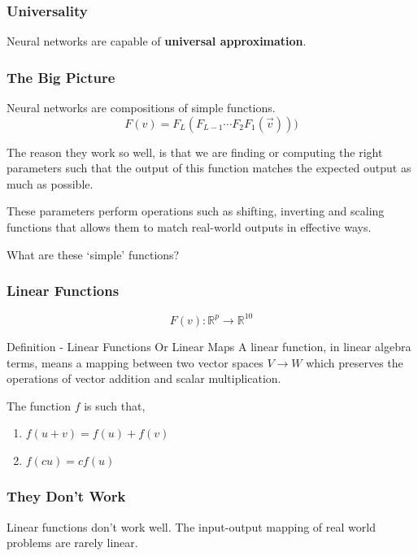 \documentclass{beamer}
\begin{document}
\begin{frame}
\frametitle{Universality}
Neural networks are capable of \textbf{universal approximation}.
\end{frame}

\begin{frame}
\frametitle{The Big Picture}
Neural networks are compositions of simple functions.
$$F(v) = F_L(F_{L-1} \cdots F_2F_1(\vec{v})))$$

The reason they work so well, is that we are finding or computing the right parameters such that the output of this function matches the expected output as much as possible.

\pause

These parameters perform operations such as shifting, inverting and scaling functions that allows them to match real-world outputs in effective ways.

\pause
What are these `simple' functions?
\end{frame}
\begin{frame}
  \frametitle{Linear Functions}
 \[F(v): \mathbb{R}^p \rightarrow \mathbb{R}^{10}\]
 \begin{block}{Definition - Linear Functions Or Linear Maps}
A linear function, in linear algebra terms, means a mapping between two vector spaces $V \rightarrow W$ which preserves the operations of vector addition and scalar multiplication.

The function $f$ is such that,
\begin{enumerate}
\item  $f(u+v) = f(u) + f(v)$
\item $f(cu) = cf(u)$
\end{enumerate}
\end{block}

\end{frame}

\begin{frame}
  \frametitle{They Don't Work}
  Linear functions don't work well.
  \pause
 The input-output mapping of real world problems are rarely linear.
\end{frame}
\end{document}
